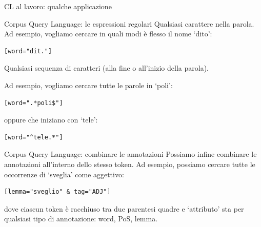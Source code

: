 \documentclass[pdf]{prosper}
\begin{document}
\begin{tsectionandpart}{CL al lavoro: qualche applicazione}
\begin{slide}{Corpus Query Language: le espressioni regolari}
Qualsiasi carattere nella parola. Ad esempio, vogliamo cercare in quali modi è flesso il nome `dito':

\begin{center}
\begin{verbatim}
[word="dit."]
\end{verbatim}
\end{center}

Qualsiasi sequenza di caratteri (alla fine o all'inizio della parola). 
	
Ad esempio, vogliamo cercare tutte le parole in `poli':

\begin{center}
\begin{verbatim}
[word=".*poli$"]
\end{verbatim}
\end{center}

oppure che iniziano con `tele':

\begin{center}
\begin{verbatim}
[word="^tele.*"]
\end{verbatim}
\end{center}

\end{slide}
\begin{slide}{Corpus Query Language: combinare le annotazioni}
Possiamo infine combinare le annotazioni all'interno dello stesso token. Ad esempio, possiamo cercare tutte le occorrenze di `sveglia' come aggettivo:

\begin{center}
\begin{verbatim}
[lemma="sveglio" & tag="ADJ"]
\end{verbatim}
\end{center}

dove ciascun token è racchiuso tra due parentesi quadre e `attributo' sta per qualsiasi tipo di annotazione: word, PoS, lemma.

\end{slide}



\end{tsectionandpart}
\end{document}
